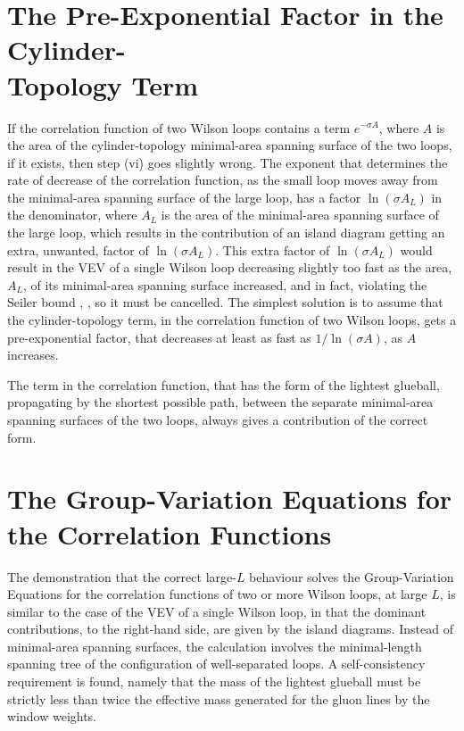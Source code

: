 \documentclass[a4paper,12pt,oneside]{article}
\begin{document}
\section{The Pre-Exponential Factor in the Cylinder-\\Topology Term}

If the correlation function of two Wilson loops contains a term $e^{-\sigma
A}$, where $A$ is the area of the cylinder-topology minimal-area spanning
surface of the two loops, if it exists, then step (vi) goes slightly wrong.
The exponent that determines the rate of decrease of the correlation
function, as the small loop moves away from the minimal-area spanning
surface of the large loop, has a factor $\ln(\sigma A_L)$ in the 
denominator, where $A_L$ is the area of the minimal-area spanning 
surface of the large loop,
which results in the contribution of an island diagram getting an extra,
unwanted, factor of $\ln(\sigma A_L)$.  This extra factor of $\ln(\sigma A_L)$
would result in the VEV of a single Wilson loop decreasing slightly too fast
as the area, $A_L$, of its minimal-area spanning surface increased, and in fact,
violating the Seiler bound \cite{Seiler}, \cite{Simon Yaffe}, so it must be cancelled.  The simplest solution
is to assume that the cylinder-topology term, in the correlation function of
two Wilson loops, gets a pre-exponential factor, that decreases at least as
fast as $1/\ln(\sigma A)$, as $A$ increases.

The term in the correlation
function, that has the form of the lightest glueball, propagating by the
shortest possible path, between the separate minimal-area spanning surfaces
of the two loops, always gives a contribution of the correct form.

\section{The Group-Variation Equations for the Correlation Functions}

The demonstration that the correct large-$L$ behaviour solves the
Group-Variation Equations for the correlation functions of two or more
Wilson loops, at large $L$, is similar to the case of the VEV of a single
Wilson loop, in that the dominant contributions, to the right-hand side, are
given by the island diagrams.  Instead of minimal-area spanning surfaces,
the calculation involves the minimal-length spanning tree of the
configuration of well-separated loops.  A self-consistency requirement is
found, namely that the mass of the lightest glueball must be strictly less
than twice the effective mass generated for the gluon lines by the window
weights.
\end{document}
